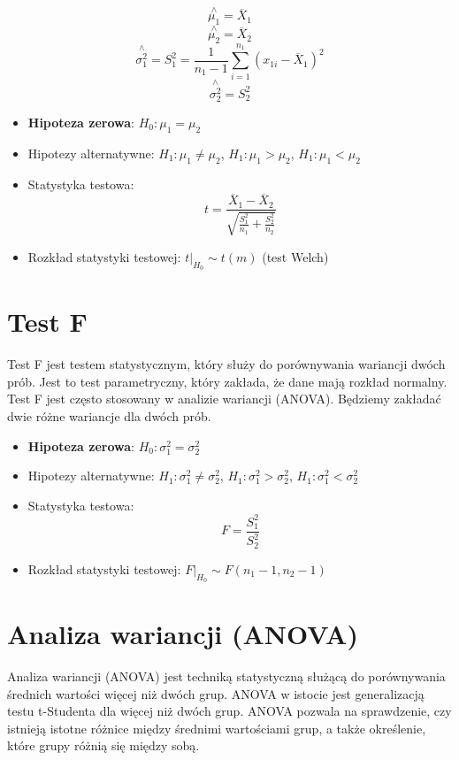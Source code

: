 \documentclass{../notatki}
\begin{document}
$$
\stackrel{\wedge}{\mu_1} = \overline{X}_1
$$
$$
\stackrel{\wedge}{\mu_2} = \overline{X}_2
$$
$$
\stackrel{\wedge}{\sigma_1^2} = S_1^2 = \frac{1}{n_1 - 1}
\sum_{i=1}^{n_1} (x_{1i} - \overline{X}_1)^2
$$
$$
\stackrel{\wedge}{\sigma_2^2} = S_2^2
$$

\begin{itemize}
  \item \textbf{Hipoteza zerowa}: $H_0: \mu_1 = \mu_2$
  \item Hipotezy alternatywne: $H_1: \mu_1 \neq \mu_2$, $H_1: \mu_1 >
    \mu_2$, $H_1: \mu_1 < \mu_2$
  \item Statystyka testowa:
    $$
    t = \frac{\overline{X}_1 - \overline{X}_2}{\sqrt{\frac{S_1^2}{n_1} +
    \frac{S_2^2}{n_2}}}
    $$
  \item Rozkład statystyki testowej: $t|_{H_0} \sim t(m)$ (test Welch)
\end{itemize}

\section{Test F}

Test F jest testem statystycznym, który służy do porównywania wariancji
dwóch prób. Jest to test parametryczny, który zakłada, że dane mają
rozkład normalny. Test F jest często stosowany w analizie wariancji (ANOVA).
Będziemy zakładać dwie różne wariancje dla dwóch prób.

\begin{itemize}
  \item \textbf{Hipoteza zerowa}: $H_0: \sigma_1^2 = \sigma_2^2$
  \item Hipotezy alternatywne: $H_1: \sigma_1^2 \neq \sigma_2^2$, $H_1:
    \sigma_1^2 > \sigma_2^2$, $H_1: \sigma_1^2 < \sigma_2^2$
  \item Statystyka testowa:
    $$
    F = \frac{S_1^2}{S_2^2}
    $$
  \item Rozkład statystyki testowej: $F|_{H_0} \sim F(n_1 - 1, n_2 - 1)$
\end{itemize}

\section{Analiza wariancji (ANOVA)}

Analiza wariancji (ANOVA) jest techniką statystyczną służącą do porównywania
średnich wartości więcej niż dwóch grup. ANOVA w istocie jest generalizacją
testu t-Studenta dla więcej niż dwóch grup. ANOVA pozwala na sprawdzenie,
czy istnieją istotne różnice między średnimi wartościami grup, a także
określenie, które grupy różnią się między sobą.
\end{document}
